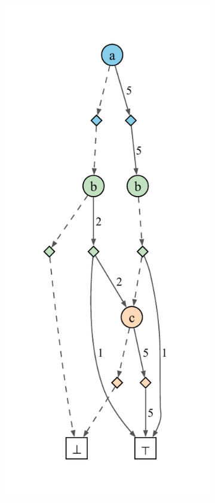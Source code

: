 \documentclass[acmsmall,dvipsnames,nonacm]{acmart}
\begin{document}
\begin{figure}
    \centering
    \begin{subfigure}[b]{0.27\textwidth}
        \centering
        \includegraphics[scale=0.5]{viz/spp1.pdf}

\end{subfigure}
\end{figure}
\end{document}
